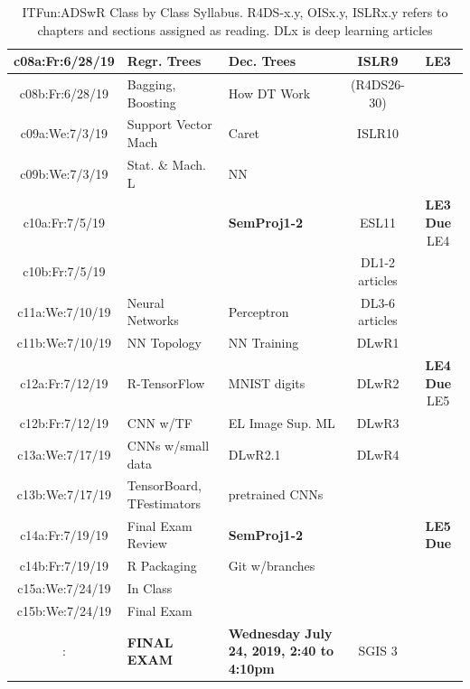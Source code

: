 \documentclass[11pt]{article} %
\begin{document}
\begin{table}[h]
\begin{tabular}{| c | p{4cm} | p{4cm} | c | c |}
    \hline
    \hline 
    c08a:Fr:6/28/19 & Regr. Trees & Dec. Trees & ISLR9 & LE3 \\ 
    \hline
    c08b:Fr:6/28/19 & Bagging, Boosting & How DT Work & (R4DS26-30) & \\
    \hline
    \hline 
    c09a:We:7/3/19 & Support Vector Mach & Caret & ISLR10 &  \\ 
    \hline 
    c09b:We:7/3/19 & Stat. \& Mach. L & NN &  &  \\
    \hline
    \hline
    c10a:Fr:7/5/19 &  & {\bf SemProj1-2} & ESL11 & {\bf LE3 Due} LE4  \\	
    \hline
    c10b:Fr:7/5/19 &  &  & DL1-2 articles &  \\
    \hline
    \hline 
    c11a:We:7/10/19 & Neural Networks  & Perceptron  & DL3-6 articles &   \\ 
    \hline
    c11b:We:7/10/19 & NN Topology & NN Training  &  DLwR1 &  \\
    \hline
    \hline 
    c12a:Fr:7/12/19 & R-TensorFlow & MNIST digits & DLwR2 & {\bf LE4 Due} LE5 \\ 
    \hline
    c12b:Fr:7/12/19 & CNN w/TF & EL Image Sup. ML & DLwR3 &  \\
    \hline
    \hline 
    c13a:We:7/17/19 & CNNs w/small data & DLwR2.1 & DLwR4 &  \\ 
    \hline
    c13b:We:7/17/19 & TensorBoard, TFestimators & pretrained CNNs &  &  \\
    \hline
    \hline 
    c14a:Fr:7/19/19 & Final Exam Review & {\bf SemProj1-2} &  & {\bf LE5 Due} \\ 
    \hline
    c14b:Fr:7/19/19 & R Packaging & Git w/branches &  &  \\
    \hline
    \hline
    c15a:We:7/24/19 & In Class &  &  & {\bf } \\ 
    \hline
    c15b:We:7/24/19 & Final Exam &  &  &  \\
    \hline
    \hline
    :  & {\bf FINAL EXAM} & {\bf Wednesday July 24, 2019, 2:40 to 4:10pm}  & SGIS 3 & \\
    \hline
    \hline
  \end{tabular} 
  \caption{ITFun:ADSwR Class by Class Syllabus.  R4DS-x.y, OISx.y, ISLRx.y refers to chapters and sections assigned as reading. DLx is deep learning articles }
  \label{table:Syllabus2} %
\end{table} 
\end{document}

